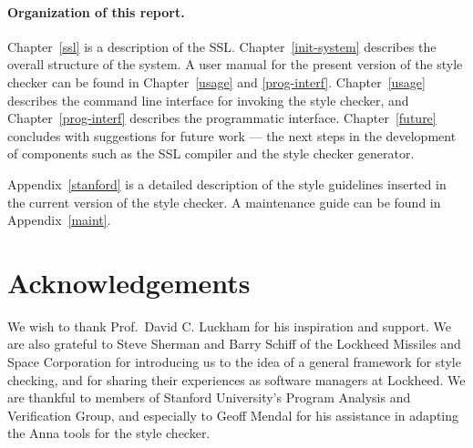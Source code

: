 \paragraph{Organization of this report.}

Chapter~\ref{ssl} is a description of the SSL.
Chapter~\ref{init-system} describes the overall structure of the system.
A user manual for the present version of the style checker can be found in
Chapter~\ref{usage} and \ref{prog-interf}.  Chapter~\ref{usage} describes
the command line interface for invoking the style checker, and
Chapter~\ref{prog-interf} describes the programmatic interface.
Chapter~\ref{future} concludes with suggestions for future work ---
the next steps in the development of components such as
the SSL compiler and the style checker generator.

Appendix~\ref{stanford} is a detailed description of the style guidelines
inserted in the current version of the style checker.
A maintenance guide can be found in Appendix~\ref{maint}.

\section{Acknowledgements}

We wish to thank Prof.~David C. Luckham for his inspiration and support.
We are also grateful to Steve Sherman and Barry Schiff of the Lockheed
Missiles and Space Corporation for introducing us to the idea of
a general framework for style checking, and for sharing their experiences
as software managers at Lockheed.  We are thankful to members of
Stanford University's Program Analysis and Verification Group, and
especially to Geoff Mendal for his assistance in adapting the Anna
tools for the style checker.

